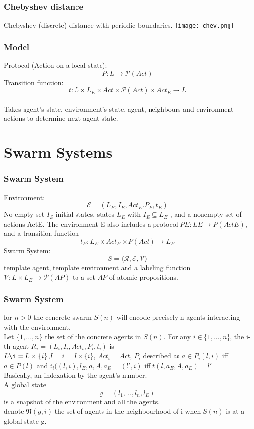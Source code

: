 \documentclass[hyperref={pdfpagelabels=false}]{beamer}
\begin{document}
\begin{frame}
  \frametitle{  Chebyshev distance }
Chebyshev (discrete) distance with periodic boundaries.
\texttt{[image: chev.png]}
\end{frame}

\begin{frame}
  \frametitle{ Model }
Protocol (Action on a local state):
$$P : L \rightarrow \mathcal{P}(Act)$$
Transition function:
$$ t : L \times L_E \times Act \times \mathcal{P}(Act) \times Act_E \rightarrow L $$\\
Takes agent's state, environment's state, agent, neighbours and environment actions to determine next agent state.
\end{frame}

\section{ Swarm Systems}
\begin{frame}
  \frametitle{ Swarm System }
  Environment:
  $$ \mathcal{E} = (L_E, I_E, Act_E. P_E, t_E)$$
  No empty set $I_E$ initial states, states $L_E$ with $I_E  \subseteq L_E$
, and a nonempty set of actions ActE. The environment
E also includes a protocol $PE : LE \rightarrow P(ActE)$,
and a transition function $$ t_E : L_E \times Act_E \times P(Act) \rightarrow L_E$$
Swarm System:
$$S = \langle \mathcal{R,E,V} \rangle$$
template agent, template environment and a labeling function $\mathcal{V}: L \times L_E  \rightarrow \mathcal{P}(AP)$ to a set $AP$ of atomic propositions.
\end{frame}

\begin{frame}
  \frametitle{ Swarm System }
  for $n>0$ the concrete swarm $S(n)$ will encode precisely n agents interacting with the environment.\\
Let $\{1,...,n\}$ the set of the concrete agents in
$S(n)$. For any $i \in \{1,...,n\}$, the i-th  agent $R_i =(L_i,I_i,Act_i,P_i,t_i)$ is\\
$L\i= L \times \{i\}$,$I=i=I \times  \{i\}$, $Act_i=Act$, $P_i$ described as $a \in P_i(l,i)$ iff $a \in P(l)$ and $t_i((l,i),l_E,a,A,a_E=(l',i)$ iff $t(l,a_E,A,a_E)=l'$\\
Basically, an indexation by the agent's number.\\
A global state\\ $$ g = (l_1,..., l_n, l_E)$$
is a snapshot of the environment and all the agents.\\
denote $\mathfrak{N}(g,i)$ the set of agents in the neighbourhood of i when $S(n)$ is at a global state g.
\end{frame}
\end{document}
